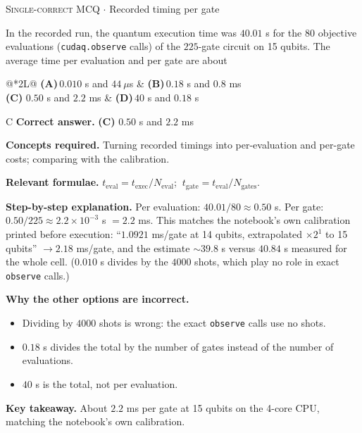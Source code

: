 \documentclass[11pt,a4paper]{article}
\newcommand{\optlabel}[1]{\textbf{(#1)}}
\newcommand{\correctlabel}[1]{\textcolor{okgreen}{\textbf{(#1)}\,\ding{51}}}
\newenvironment{qitem}[1]{\begin{list}{}{\setlength{\leftmargin}{3.3em}\setlength{\labelwidth}{3.1em}%
  \setlength{\labelsep}{0.2em}\setlength{\topsep}{3pt}\setlength{\parsep}{3pt}}\item[\textbf{Q.#1}\hfill]}{\end{list}}
\newcommand{\qsep}{\par\vspace{2pt}{\color{black!15}\hrule}\vspace{4pt}}
\newcommand{\qmeta}[2]{{\footnotesize\color{black!60}\textsc{#1} \;$\cdot$\; #2}\par}
\begin{document}
\begin{qitem}{75}
\qmeta{Single-correct MCQ}{Recorded timing per gate}
In the recorded run, the quantum execution time was $40.01$ s for the $80$ objective evaluations (\texttt{cudaq.observe}
calls) of the $225$-gate circuit on 15 qubits. The average time per evaluation and per gate are about
\par\smallskip\noindent\begin{tabularx}{\linewidth}{@{}*{2}{L}@{}}
\optlabel{A}\,$0.010$ s and $44\ \mu$s & \optlabel{B}\,$0.18$ s and $0.8$ ms \\[3pt]
\correctlabel{C}\,$0.50$ s and $2.2$ ms & \optlabel{D}\,$40$ s and $0.18$ s
\end{tabularx}
\end{qitem}
\begin{solbox}{C}
\textbf{\color{brand}Correct answer.} \textcolor{okgreen}{\textbf{(C)}} $0.50$ s and $2.2$ ms

\textbf{\color{brand}Concepts required.} Turning recorded timings into per-evaluation and per-gate costs; comparing with the calibration.

\textbf{\color{brand}Relevant formulae.} $t_{\text{eval}} = t_{\text{exec}}/N_{\text{eval}}$; $\ t_{\text{gate}} = t_{\text{eval}}/N_{\text{gates}}$.

\textbf{\color{brand}Step-by-step explanation.} Per evaluation: $40.01/80 \approx 0.50$ s. Per gate: $0.50/225 \approx 2.2\times10^{-3}$ s $= 2.2$ ms.
This matches the notebook's own calibration printed before execution: ``$1.0921$ ms/gate at 14 qubits, extrapolated $\times2^1$
to 15 qubits'' $\to 2.18$ ms/gate, and the estimate $\sim39.8$ s versus $40.84$ s measured for the whole cell.
($0.010$ s divides by the $4000$ shots, which play no role in exact \texttt{observe} calls.)

\textbf{\color{brand}Why the other options are incorrect.}
\begin{itemize}[leftmargin=2.4em, itemsep=1pt, topsep=2pt]
\item[\textbf{(A)}] Dividing by $4000$ shots is wrong: the exact \texttt{observe} calls use no shots.
\item[\textbf{(B)}] $0.18$ s divides the total by the number of gates instead of the number of evaluations.
\item[\textbf{(D)}] $40$ s is the total, not per evaluation.
\end{itemize}
\textbf{\color{brand}Key takeaway.} About $2.2$ ms per gate at 15 qubits on the 4-core CPU, matching the notebook's own calibration.
\end{solbox}
\qsep
\end{document}
